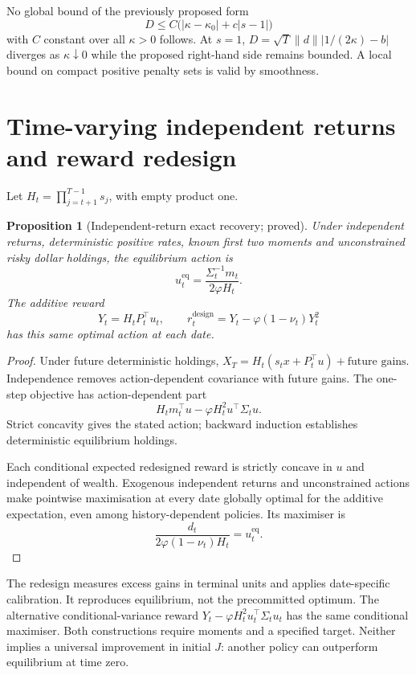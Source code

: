 \documentclass[11pt,a4paper]{article}
\theoremstyle{plain}
\newtheorem{proposition}[theorem]{Proposition}
\theoremstyle{definition}
\theoremstyle{remark}
\begin{document}
No global bound of the previously proposed form
\[
 D\le C\bigl(|\kappa-\kappa_0|+c|s-1|\bigr)
\]
with $C$ constant over all $\kappa>0$ follows. At $s=1$,
$D=\sqrt{T}\|d\||1/(2\kappa)-b|$ diverges as $\kappa\downarrow0$ while the
proposed right-hand side remains bounded. A local bound on compact positive
penalty sets is valid by smoothness.

\ifdim\dimexpr\pagegoal-\pagetotal\relax<120pt\newpage\fi
\section{Time-varying independent returns and reward redesign}
\label{app:redesign}
Let $H_t=\prod_{j=t+1}^{T-1}s_j$, with empty product one.
\begin{proposition}[Independent-return exact recovery; proved]
Under independent returns, deterministic positive rates, known first two
moments and unconstrained risky dollar holdings, the equilibrium action is
\[
 u_t^{\mathrm{eq}}=\frac{\Sigma_t^{-1}m_t}{2\varphi H_t}.
\]
The additive reward
\[
 Y_t=H_tP_t^{\top}u_t,\qquad
 r_t^{\mathrm{design}}=Y_t-\varphi(1-\nu_t)Y_t^2
\]
has this same optimal action at each date.
\end{proposition}
\begin{proof}
Under future deterministic holdings,
$X_T=H_t(s_tx+P_t^{\top}u)+\text{future gains}$.
Independence removes action-dependent covariance with future gains. The
one-step objective has action-dependent part
\[
 H_tm_t^{\top}u-\varphi H_t^2u^{\top}\Sigma_tu.
\]
Strict concavity gives the stated action; backward induction establishes
deterministic equilibrium holdings.

Each conditional expected redesigned reward is strictly concave in $u$ and
independent of wealth. Exogenous independent returns and unconstrained actions
make pointwise maximisation at every date globally optimal for the additive
expectation, even among history-dependent policies. Its maximiser is
\[
 \frac{d_t}{2\varphi(1-\nu_t)H_t}=u_t^{\mathrm{eq}}.
\]
\end{proof}
The redesign measures excess gains in terminal units and applies date-specific
calibration. It reproduces equilibrium, not the precommitted optimum. The
alternative conditional-variance reward
$Y_t-\varphi H_t^2u_t^{\top}\Sigma_tu_t$ has the same conditional maximiser.
Both constructions require moments and a specified target. Neither implies a
universal improvement in initial $J$: another policy can outperform equilibrium
at time zero.
\end{document}

